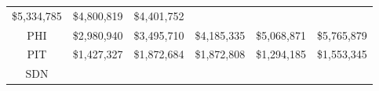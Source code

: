 \documentclass[]{book}
\theoremstyle{definition}
\theoremstyle{definition}
\theoremstyle{definition}
\theoremstyle{remark}
\begin{document}
\begin{longtable}[]{@{}cccccc@{}}
\begin{minipage}[t]{0.15\columnwidth}
\$5,334,785\strut
\end{minipage} & \begin{minipage}[t]{0.15\columnwidth}\centering
\$4,800,819\strut
\end{minipage} & \begin{minipage}[t]{0.15\columnwidth}\centering
\$4,401,752\strut
\end{minipage}\tabularnewline
\begin{minipage}[t]{0.09\columnwidth}\centering
PHI\strut
\end{minipage} & \begin{minipage}[t]{0.15\columnwidth}\centering
\$2,980,940\strut
\end{minipage} & \begin{minipage}[t]{0.15\columnwidth}\centering
\$3,495,710\strut
\end{minipage} & \begin{minipage}[t]{0.15\columnwidth}\centering
\$4,185,335\strut
\end{minipage} & \begin{minipage}[t]{0.15\columnwidth}\centering
\$5,068,871\strut
\end{minipage} & \begin{minipage}[t]{0.15\columnwidth}\centering
\$5,765,879\strut
\end{minipage}\tabularnewline
\begin{minipage}[t]{0.09\columnwidth}\centering
PIT\strut
\end{minipage} & \begin{minipage}[t]{0.15\columnwidth}\centering
\$1,427,327\strut
\end{minipage} & \begin{minipage}[t]{0.15\columnwidth}\centering
\$1,872,684\strut
\end{minipage} & \begin{minipage}[t]{0.15\columnwidth}\centering
\$1,872,808\strut
\end{minipage} & \begin{minipage}[t]{0.15\columnwidth}\centering
\$1,294,185\strut
\end{minipage} & \begin{minipage}[t]{0.15\columnwidth}\centering
\$1,553,345\strut
\end{minipage}\tabularnewline
\begin{minipage}[t]{0.09\columnwidth}\centering
SDN\strut
\end{minipage} & \begin{minipage}[t]{0.15\columnwidth}\centering

\end{minipage}
\end{longtable}
\end{document}
